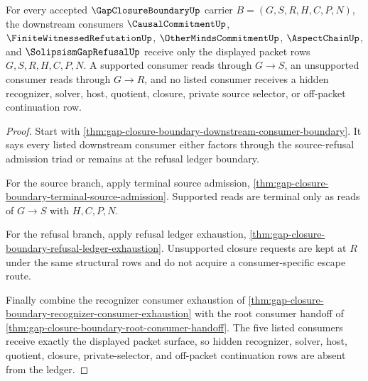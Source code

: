 \begin{theorem}
\label{thm:gap-closure-boundary-consumer-ledger-nonescape}
For every accepted $\GapClosureBoundaryUp$ carrier $B=(G,S,R,H,C,P,N)$, the downstream consumers $\CausalCommitmentUp$, $\FiniteWitnessedRefutationUp$, $\OtherMindsCommitmentUp$, $\AspectChainUp$, and $\SolipsismGapRefusalUp$ receive only the displayed packet rows $G,S,R,H,C,P,N$. A supported consumer reads through $G \longrightarrow S$, an unsupported consumer reads through $G \longrightarrow R$, and no listed consumer receives a hidden recognizer, solver, host, quotient, closure, private source selector, or off-packet continuation row.
\end{theorem}
\begin{proof}
Start with \autoref{thm:gap-closure-boundary-downstream-consumer-boundary}. It says every listed downstream consumer either factors through the source-refusal admission triad or remains at the refusal ledger boundary.

For the source branch, apply terminal source admission, \autoref{thm:gap-closure-boundary-terminal-source-admission}. Supported reads are terminal only as reads of $G \longrightarrow S$ with $H,C,P,N$.

For the refusal branch, apply refusal ledger exhaustion, \autoref{thm:gap-closure-boundary-refusal-ledger-exhaustion}. Unsupported closure requests are kept at $R$ under the same structural rows and do not acquire a consumer-specific escape route.

Finally combine the recognizer consumer exhaustion of \autoref{thm:gap-closure-boundary-recognizer-consumer-exhaustion} with the root consumer handoff of \autoref{thm:gap-closure-boundary-root-consumer-handoff}. The five listed consumers receive exactly the displayed packet surface, so hidden recognizer, solver, host, quotient, closure, private-selector, and off-packet continuation rows are absent from the ledger.
\end{proof}

